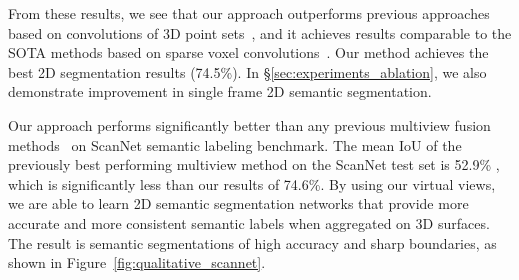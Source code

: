 \documentclass[runningheads]{llncs}
\newcommand{\Sec}[1]{\S\ref{#1}}
\begin{document}
From these results, we see that our approach outperforms previous approaches based on convolutions of 3D point sets~\cite{qi2017pointnet,wu2019pointconv,thomas2019kpconv,yan2020pointasnl,jsenet}, and it achieves results comparable to the SOTA methods based on sparse voxel convolutions~\cite{graham20183d,choy20194d,han2020occuseg}. Our method achieves the best 2D segmentation results (74.5\%). In \Sec{sec:experiments_ablation}, we also demonstrate improvement in single frame 2D semantic segmentation.

Our approach performs significantly better than any previous multiview fusion methods~\cite{dai20183dmv,narita2019panopticfusion} on ScanNet semantic labeling benchmark. The mean IoU of the previously best performing multiview method on the ScanNet test set is 52.9\% \cite{narita2019panopticfusion}, which is significantly less than our results of 74.6\%.  By using our virtual views, we are able to learn 2D semantic segmentation networks that provide more accurate and more consistent semantic labels when aggregated on 3D surfaces.  The result is semantic segmentations of high accuracy and sharp boundaries, as shown in Figure~\ref{fig:qualitative_scannet}.
\end{document}
